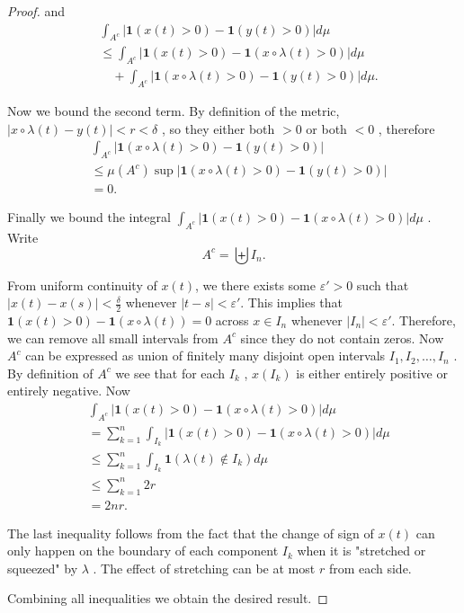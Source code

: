 \begin{proof}
		and  
		  \begin{align*}
		  &\int_{A^c} \left| \mathbf{1}\left( x(t) > 0 \right)  - \mathbf{1}\left( y(t) > 0 \right)  \right| d\mu \\
		  	&\le \int _{A^c} \left| \mathbf{1}\left( x(t) >0 \right) -\mathbf{1}\left( x \circ \lambda(t) > 0 \right)  \right| d \mu\\
		  	& \quad + \int _{A^c} \left| \mathbf{1}\left( x \circ \lambda(t) > 0 \right) - \mathbf{1}\left( y(t) >0 \right) \right| d \mu
		  .
		  \end{align*}
		    
		Now we bound the second term. By definition of the metric, $\left| x\circ \lambda(t) - y(t) \right| < r < \delta$ , so they either both $>0$ or both $<0$ , therefore  
		  \begin{align*}
		  &\int _{A^c} \left| \mathbf{1}\left( x \circ \lambda(t) > 0 \right) - \mathbf{1}\left( y(t) >0 \right) \right| \\
		  	&\le \mu(A^c) \operatorname{sup}  \left| \mathbf{1}\left( x \circ \lambda(t) > 0 \right) - \mathbf{1}\left( y(t) >0 \right) \right|\\
		  	&= 0 
		  .
		  \end{align*}
		    
		Finally we bound the integral $\displaystyle \int_{A^c}|\mathbf{1}(x(t)>0)-\mathbf{1}(x \circ \lambda(t)>0)| d \mu$ .  
		Write 
		\[
			A^c = \biguplus I_n
		.\] 

		From uniform continuity of $x(t)$, we there exists some $\varepsilon' > 0$ such that  $|x(t) - x(s)|< \frac{\delta}{2}$ whenever $|t - s| < \varepsilon'$. This implies that $\mathbf{1}(x(t)>0) - \mathbf{1}(x\circ \lambda(t)) = 0$ across $x \in I_n$ whenever $|I_n| < \varepsilon'$. Therefore, we can remove all small intervals from $A^c$ since they do not contain zeros. Now $A^c$ can be expressed as union of finitely many disjoint open intervals $I_1, I_2, \ldots, I_n$ . By definition of $A^c$ we see that for each $I_k$ , $x(I_k)$ is either entirely positive or entirely negative.  
		Now  
		  \begin{align*}
		  & \int _{A^c} \left| \mathbf{1}\left( x(t) >0 \right) -\mathbf{1}\left( x \circ \lambda(t) > 0 \right)  \right| d \mu\\
		  	&= \sum_{k=1}^{n} \int _{I_k}   \left| \mathbf{1}\left( x(t) >0 \right) -\mathbf{1}\left( x \circ \lambda(t) > 0 \right)  \right| d \mu\\
		  	&\le  \sum_{k=1}^{n} \int _{I_k}   \mathbf{1}\left( \lambda(t) \not\in I_k \right)  d \mu\\
		  	&\le \sum_{k=1}^{n} 2 r \\
		  	&= 2 n r
		  .
		  \end{align*}
		    
		The last inequality follows from the fact that the change of sign of $x(t)$ can only happen on the boundary of each component $I_k$ when it is "stretched or squeezed" by $\lambda$ . The effect of stretching can be at most $r$ from each side.  

		Combining all inequalities we obtain the desired result.   
\end{proof}

